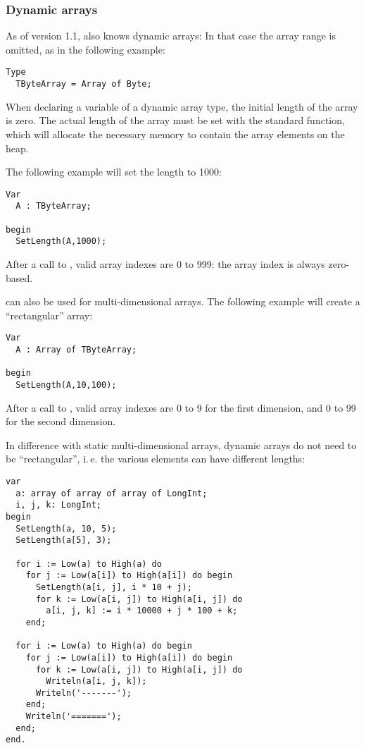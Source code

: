 \subsubsection{Dynamic arrays}
As of version 1.1, \fpc also knows dynamic arrays: In that case the array
range is omitted, as in the following example:
\begin{verbatim}
Type
  TByteArray = Array of Byte;
\end{verbatim}
When declaring a variable of a dynamic array type, the initial length of the
array is zero. The actual length of the array must be set with the standard
 function, which will allocate the necessary memory to contain
the array elements on the heap.

The following example will set the length to 1000:
\begin{verbatim}
Var
  A : TByteArray;

begin
  SetLength(A,1000);
\end{verbatim}
After a call to , valid array indexes are 0 to 999: the array
index is always zero-based.

 can also be used for multi-dimensional arrays. The following example will create
a ``rectangular'' array:
\begin{verbatim}
Var
  A : Array of TByteArray;

begin
  SetLength(A,10,100);
\end{verbatim}
After a call to , valid array indexes are 0 to 9 for the
first dimension, and 0 to 99 for the second dimension.

In difference with static multi-dimensional arrays, dynamic arrays do not
need to be ``rectangular'', i.\,e. the various elements can have different
lengths:
\begin{verbatim}
var
  a: array of array of array of LongInt;
  i, j, k: LongInt;
begin
  SetLength(a, 10, 5);
  SetLength(a[5], 3);

  for i := Low(a) to High(a) do
    for j := Low(a[i]) to High(a[i]) do begin
      SetLength(a[i, j], i * 10 + j);
      for k := Low(a[i, j]) to High(a[i, j]) do
        a[i, j, k] := i * 10000 + j * 100 + k;
    end;

  for i := Low(a) to High(a) do begin
    for j := Low(a[i]) to High(a[i]) do begin
      for k := Low(a[i, j]) to High(a[i, j]) do
        Writeln(a[i, j, k]);
      Writeln('-------');
    end;
    Writeln('=======');
  end;
end.
\end{verbatim}

